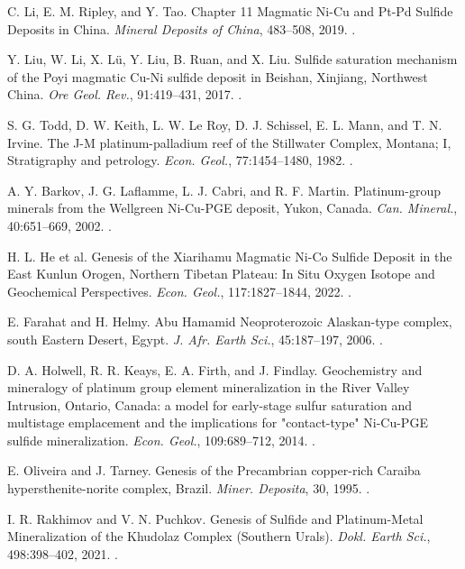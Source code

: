 C. Li, E. M. Ripley, and Y. Tao. Chapter 11 Magmatic Ni-Cu and Pt-Pd Sulfide Deposits in China. \textit{Mineral Deposits of China}, 483--508, 2019. .

 Y. Liu, W. Li, X. Lü, Y. Liu, B. Ruan, and X. Liu. Sulfide saturation mechanism of the Poyi magmatic Cu-Ni sulfide deposit in Beishan, Xinjiang, Northwest China. \textit{Ore Geol. Rev.}, 91:419--431, 2017. .

 S. G. Todd, D. W. Keith, L. W. Le Roy, D. J. Schissel, E. L. Mann, and T. N. Irvine. The J-M platinum-palladium reef of the Stillwater Complex, Montana; I, Stratigraphy and petrology. \textit{Econ. Geol.}, 77:1454--1480, 1982. .

 A. Y. Barkov, J. G. Laflamme, L. J. Cabri, and R. F. Martin. Platinum-group minerals from the Wellgreen Ni-Cu-PGE deposit, Yukon, Canada. \textit{Can. Mineral.}, 40:651--669, 2002. .

 H. L. He et al. Genesis of the Xiarihamu Magmatic Ni-Co Sulfide Deposit in the East Kunlun Orogen, Northern Tibetan Plateau: In Situ Oxygen Isotope and Geochemical Perspectives. \textit{Econ. Geol.}, 117:1827--1844, 2022. .

 E. Farahat and H. Helmy. Abu Hamamid Neoproterozoic Alaskan-type complex, south Eastern Desert, Egypt. \textit{J. Afr. Earth Sci.}, 45:187--197, 2006. .

 D. A. Holwell, R. R. Keays, E. A. Firth, and J. Findlay. Geochemistry and mineralogy of platinum group element mineralization in the River Valley Intrusion, Ontario, Canada: a model for early-stage sulfur saturation and multistage emplacement and the implications for "contact-type" Ni-Cu-PGE sulfide mineralization. \textit{Econ. Geol.}, 109:689--712, 2014. .

 E. Oliveira and J. Tarney. Genesis of the Precambrian copper-rich Caraiba hypersthenite-norite complex, Brazil. \textit{Miner. Deposita}, 30, 1995. .

 I. R. Rakhimov and V. N. Puchkov. Genesis of Sulfide and Platinum-Metal Mineralization of the Khudolaz Complex (Southern Urals). \textit{Dokl. Earth Sci.}, 498:398--402, 2021. .

